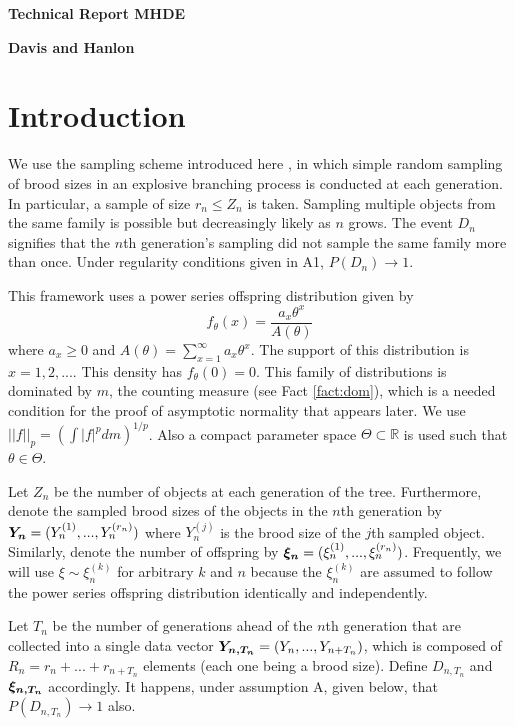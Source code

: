 \documentclass[11 pt]{article}
\renewcommand{\th}{\theta}
\newcommand{\Title}[1]{\begin{center}{\Large \bf #1} \end{center}}
\newcommand{\boldYn}{\mbox{\boldmath $Y_n$}}
\newcommand{\boldUn}{\mbox{\boldmath $\xi_n$}}
\newcommand{\boldYnt}{\mbox{\boldmath $Y_{n,T_n}$}}
\newcommand{\boldUnpt}{\mbox{\boldmath $\xi_{n,T_n}$}}
\newcommand{\Dnt}{D_{n,T_n}}
\begin{document}
\Title{Technical Report MHDE}
\Title{Davis and Hanlon}

\renewcommand{\th}{\theta}

\section{Introduction}

\newcommand{\fth}{f_{\th}(x)}
\newcommand{\fapp}{f_{\th,\text{app}}(x)}
We use the sampling scheme introduced here \cite{mm}, in which simple random sampling of brood sizes in an explosive branching process is conducted at each generation. In particular, a sample of size $r_n \leq Z_n$ is taken. Sampling multiple objects from the same family is possible but decreasingly likely as $n$ grows. The event $D_n$ signifies that the $n$th generation's sampling did not sample the same family more than once. Under regularity conditions given in A1, $P(D_n) \rightarrow 1$.

This framework uses a power series offspring distribution given by
\[
\fth = \frac{a_x\th^x}{A(\th)}
\]
where $a_x \geq 0$ and $A(\th) = \sum_{x=1}^{\infty}a_x\th^x$. The support of this distribution is $x=1,2,...$. This density has $f_{\th}(0)=0$. This family of distributions is dominated by $m$, the counting measure (see Fact \ref{fact:dom}), which is a needed condition for the proof of asymptotic normality that appears later. We use $||f||_p = \left( \int |f|^{p} dm \right )^{1/p}$. Also a compact parameter space $\Theta \subset \mathbb{R}$ is used such that $\th \in \Theta$.

Let $Z_n$ be the number of objects at each generation of the tree. Furthermore, denote the sampled brood sizes of the objects in the $n$th generation by $\boldYn = (Y^{(1)}_n,...,Y^{(r_n)}_n)$ where $Y^{(j)}_n$ is the brood size of the $j$th sampled object. Similarly, denote the number of offspring by $\boldUn = (\xi^{(1)}_n,...,\xi^{(r_n)}_n)$. Frequently, we will use $\xi \sim \xi_n^{(k)}$ for arbitrary $k$ and $n$ because the $\xi_n^{(k)}$ are assumed to follow the power series offspring distribution identically and independently.

Let $T_n$ be the number of generations ahead of the $n$th generation that are collected into a single data vector $\boldYnt = (Y_n,...,Y_{n + T_n})$, which is composed of $R_n = r_n + ... + r_{n + T_n}$ elements (each one being a brood size). Define $\Dnt$ and $\boldUnpt$ accordingly. It happens, under assumption A, given below, that $P(\Dnt) \rightarrow 1$ also. 
\end{document}
